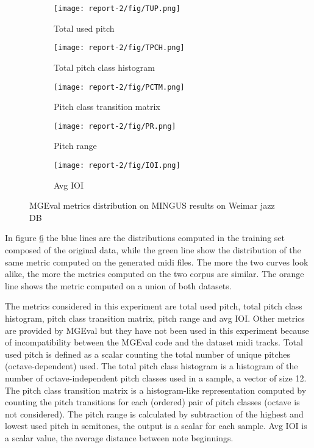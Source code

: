 \documentclass{article}
\begin{document}
\begin{figure}[htbp]
    \centering
     \begin{subfigure}[b]{0.3\textwidth}
         \centering
         \texttt{[image: report-2/fig/TUP.png]}
         \caption{Total used pitch}
         \label{fig:tup}
     \end{subfigure}
     \hfill
     \begin{subfigure}[b]{0.3\textwidth}
         \centering
         \texttt{[image: report-2/fig/TPCH.png]}
         \caption{Total pitch class histogram}
         \label{fig:tpch}
     \end{subfigure}
     \begin{subfigure}[b]{0.32\textwidth}
         \centering
         \texttt{[image: report-2/fig/PCTM.png]}
         \caption{Pitch class transition matrix}
         \label{fig:pctm}
     \end{subfigure}
     \begin{subfigure}[b]{0.32\textwidth}
         \centering
         \texttt{[image: report-2/fig/PR.png]}
         \caption{Pitch range}
         \label{fig:pr}
     \end{subfigure}
     \begin{subfigure}[b]{0.3\textwidth}
         \centering
         \texttt{[image: report-2/fig/IOI.png]}
         \caption{Avg IOI}
         \label{fig:ioi}
     \end{subfigure}
	\caption{MGEval metrics distribution on MINGUS results on Weimar jazz DB}
	\label{fig:MGEval}
\end{figure}

In figure \ref{fig:MGEval} the blue lines are the distributions computed in the training set composed of the original data, while the green line show the distribution of the same metric computed on the generated midi files. The more the two curves look alike, the more the metrics computed on the two corpus are similar. The orange line shows the metric computed on a union of both datasets. 

The metrics considered in this experiment are total used pitch, total pitch class histogram, pitch class transition matrix, pitch range and avg IOI. Other metrics are provided by MGEval but they have not been used in this experiment because of incompatibility between the MGEval code and the dataset midi tracks. Total used pitch is defined as a scalar counting the total number of unique pitches (octave-dependent) used. The total pitch class histogram is a histogram of the number of octave-independent pitch classes used in a sample, a vector of size 12. The pitch class transition matrix is a histogram-like representation computed by counting the pitch transitions for each (ordered) pair of pitch classes (octave is not considered). The pitch range is calculated by subtraction of the highest and lowest used pitch in semitones, the output is a scalar for each sample. Avg IOI is a scalar value, the average distance between note beginnings. 
\end{document}
